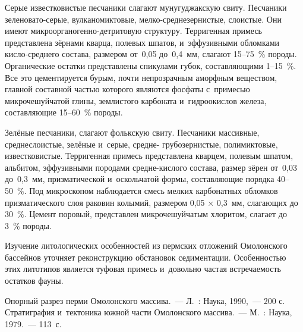 Серые известковистые песчаники слагают мунугуджакскую свиту. Песчаники зеленовато-серые, вулканомиктовые, мелко-среднезернистые, слоистые. Они имеют микроорганогенно-детритовую структуру. Терригенная примесь представлена зёрнами кварца, полевых шпатов, и~эффузивными обломками кисло-среднего состава, размером от~0,05 до~0,4~мм, слагают 15--75~\% породы. Органические остатки представлены спикулами губок, составляющими 1--15~\%. Все это цементируется бурым, почти непрозрачным аморфным веществом, главной составной частью которого являются фосфаты с~примесью микрочешуйчатой глины, землистого карбоната и~гидроокислов железа, составляющие 15--60~\% породы.

Зелёные песчаники, слагают фолькскую свиту. Песчаники массивные, среднеслоистые, зелёные и~серые, средне- грубозернистые, полимиктовые, известковистые. Терригенная примесь представлена кварцем, полевым шпатом, альбитом, эффузивными породами средне-кислого состава, размер зёрен от~0,03 до~0,3~мм, призматической и~оскольчатой формы, составляющие порядка 40--50~\%. Под микроскопом наблюдается смесь мелких карбонатных обломков призматического слоя раковин колымий, размером 0,05 $\times$ 0,3~мм, слагающих до 30~\%. Цемент поровый, представлен микрочешуйчатым хлоритом, слагает до 3~\% породы.

Изучение литологических особенностей из пермских отложений Омолонского бассейнов уточняет реконструкцию обстановок седиментации. Особенностью этих литотипов является туфовая примесь и~довольно частая встречаемость остатков фауны.

\begin{thebibliography}{99}

\bibitem{} Опорный разрез перми Омолонского массива.~--- Л.~: Наука, 1990,~--- 200 с.
\bibitem{} Стратиграфия и~тектоника южной части Омолонского массива.~--- М.~: Наука, 1979.~--- 113~с.
\end{thebibliography}
